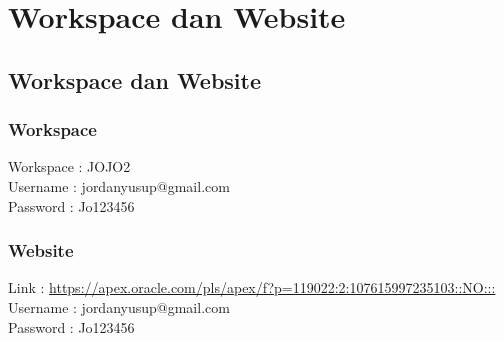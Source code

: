 \chapter{Workspace dan Website}

\section{Workspace dan Website}

\subsection{Workspace}
Workspace	: JOJO2\\
Username	: jordanyusup@gmail.com\\
Password	: Jo123456

\subsection{Website}
Link 		: \url{https://apex.oracle.com/pls/apex/f?p=119022:2:107615997235103::NO:::}\\
Username	: jordanyusup@gmail.com\\
Password	: Jo123456

